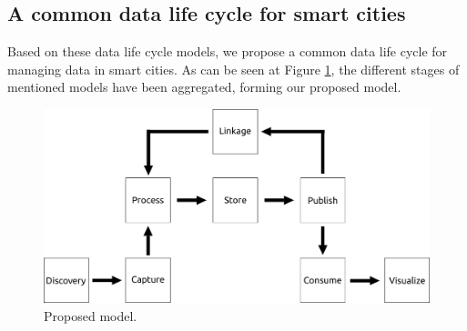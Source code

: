 \subsection{A common data life cycle for smart cities}

Based on these data life cycle models, we propose a common data life cycle for managing data in smart cities. As can be seen at Figure \ref{fig:model}, the different stages of mentioned models have been aggregated, forming our proposed model.

\begin{figure}
    \center
    \includegraphics[width=0.9\linewidth]{img/data_lifecycle/model.pdf}
    \caption{Proposed model.}
    \label{fig:model}
\end{figure}

